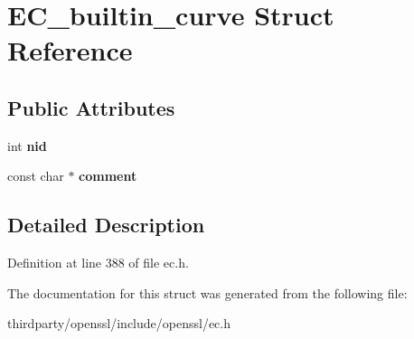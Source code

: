 \hypertarget{struct_e_c__builtin__curve}{}\section{E\+C\+\_\+builtin\+\_\+curve Struct Reference}
\label{struct_e_c__builtin__curve}
\subsection*{Public Attributes}
\begin{DoxyCompactItemize}
\item 
\mbox{\label{struct_e_c__builtin__curve_a31dc38a7d4ada38cd9249b87fb5d8f20}} 
int {\bfseries nid}
\item 
\mbox{\label{struct_e_c__builtin__curve_a1c394e4731adad55a8fdc5ed25400ab1}} 
const char $\ast$ {\bfseries comment}
\end{DoxyCompactItemize}


\subsection{Detailed Description}


Definition at line 388 of file ec.\+h.



The documentation for this struct was generated from the following file\+:\begin{DoxyCompactItemize}
\item 
thirdparty/openssl/include/openssl/ec.\+h\end{DoxyCompactItemize}
